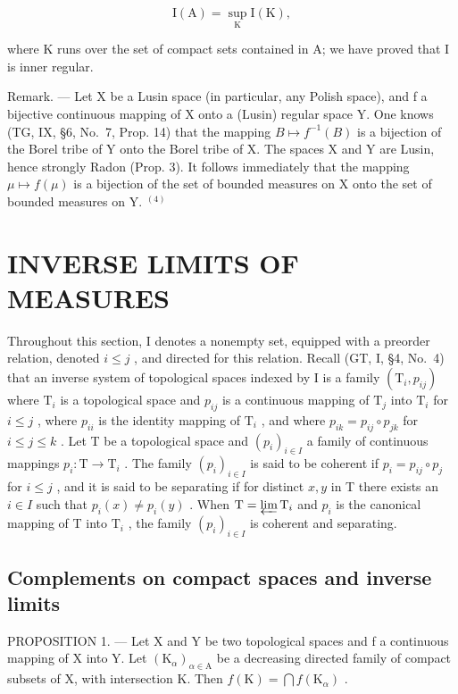 \[
\mathrm{I} (\mathrm{A}) = \sup _ {\mathrm{K}} \mathrm{I} (\mathrm{K}),
\]

where K runs over the set of compact sets contained in A; we have proved that I is inner regular.

Remark. --- Let X be a Lusin space (in particular, any Polish space), and f a bijective continuous mapping of X onto a (Lusin) regular space Y. One knows (TG, IX, §6, No.~7, Prop. 14) that the mapping \(B \mapsto f^{-1}(B)\) is a bijection of the Borel tribe of Y onto the Borel tribe of X. The spaces X and Y are Lusin, hence strongly Radon (Prop. 3). It follows immediately that the mapping \(\mu \mapsto f(\mu)\) is a bijection of the set of bounded measures on X onto the set of bounded measures on Y. \(^{(4)}\)

\section{INVERSE LIMITS OF MEASURES}

Throughout this section, I denotes a nonempty set, equipped with a preorder relation, denoted \(i \leqslant j\) , and directed for this relation. Recall (GT, I, §4, No.~4) that an inverse system of topological spaces indexed by I is a family \((\mathrm{T}_i, p_{ij})\) where \(\mathrm{T}_i\) is a topological space and \(p_{ij}\) is a continuous mapping of \(\mathrm{T}_j\) into \(\mathrm{T}_i\) for \(i \leqslant j\) , where \(p_{ii}\) is the identity mapping of \(\mathrm{T}_i\) , and where \(p_{ik} = p_{ij} \circ p_{jk}\) for \(i \leqslant j \leqslant k\) . Let T be a topological space and \((p_i)_{i \in I}\) a family of continuous mappings \(p_i: \mathrm{T} \to \mathrm{T}_i\) . The family \((p_i)_{i \in I}\) is said to be coherent if \(p_i = p_{ij} \circ p_j\) for \(i \leqslant j\) , and it is said to be separating if for distinct \(x, y\) in T there exists an \(i \in I\) such that \(p_i(x) \neq p_i(y)\) . When \(\mathrm{T} = \varprojlim \mathrm{T}_i\) and \(p_i\) is the canonical mapping of T into \(\mathrm{T}_i\) , the family \((p_i)_{i \in I}\) is coherent and separating.

\subsection{Complements on compact spaces and inverse limits}

PROPOSITION 1. --- Let X and Y be two topological spaces and f a continuous mapping of X into Y. Let \((\mathrm{K}_{\alpha})_{\alpha \in \mathrm{A}}\) be a decreasing directed family of compact subsets of X, with intersection K. Then \(f(\mathrm{K}) = \bigcap f(\mathrm{K}_{\alpha})\) .

